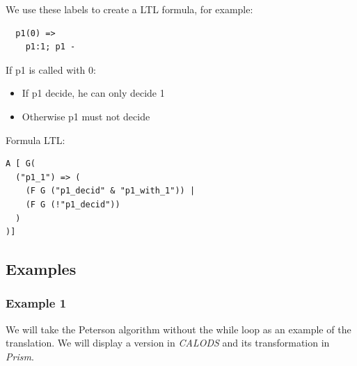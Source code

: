 \documentclass{article}
\begin{document}
We use these labels to create a LTL formula, for example:\\
\begin{lstlisting}
  p1(0) =>
    p1:1; p1 -
\end{lstlisting}
If p1 is called with 0:
\begin{itemize}
  \item{If p1 decide, he can only decide 1}
  \item{Otherwise p1 must not decide}
\end{itemize}

Formula LTL:
\begin{lstlisting}
A [ G(
  ("p1_1") => (
    (F G ("p1_decid" & "p1_with_1")) |
    (F G (!"p1_decid"))
  )
)]
\end{lstlisting}

\subsection{Examples}
\subsubsection{Example 1}
We will take the Peterson algorithm without the while loop as an example of the translation. We will display a version in \textit{CALODS} and its transformation in \textit{Prism}.
\end{document}
